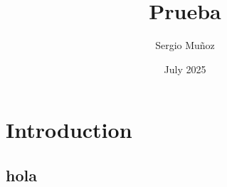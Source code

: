 \documentclass{article}
\title{Prueba}
\author{Sergio Muñoz}
\date{July 2025}
\begin{document}
\maketitle

\section{Introduction}
\subsection{hola}
\end{document}
